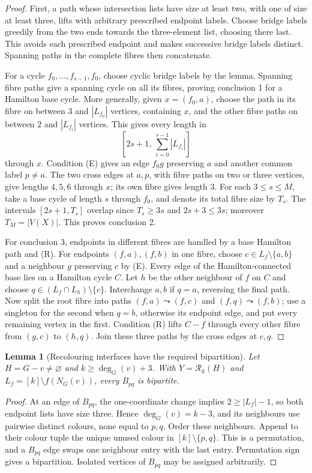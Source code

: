 \documentclass[11pt]{article}
\newtheorem{lemma}{Lemma}
\begin{document}
\begin{proof}
First, a path whose intersection lists have size at least two, with one
of size at least three, lifts with arbitrary prescribed endpoint labels. Choose
bridge labels greedily from the two ends towards the three-element list,
choosing there last. This avoids each prescribed endpoint and makes
successive bridge labels distinct. Spanning paths in the complete fibres
then concatenate.

For a cycle $f_0,\ldots,f_{s-1},f_0$, choose cyclic bridge labels by the
lemma. Spanning fibre paths give a spanning cycle on all its fibres,
proving conclusion 1 for a Hamilton base cycle. More generally, given
$x=(f_0,a)$, choose the path in its fibre on between $3$ and $|L_{f_0}|$
vertices, containing $x$, and the other fibre paths on between $2$ and
$|L_{f_i}|$ vertices. This gives every length in
\[
 [2s+1,\ \sum_{i=0}^{s-1}|L_{f_i}|]
\]
through $x$. Condition (E) gives an edge $f_0g$ preserving $a$ and
another common label $p\ne a$. The two cross edges at $a,p$, with
fibre paths on two or three vertices, give lengths $4,5,6$ through $x$;
its own fibre gives length $3$. For each $3\le s\le M$, take a base
cycle of length $s$ through $f_0$, and denote its total fibre size by
$T_s$. The intervals $[2s+1,T_s]$ overlap since $T_s\ge3s$ and
$2s+3\le3s$; moreover $T_M=|V(X)|$. This proves conclusion 2.

For conclusion 3, endpoints in different fibres are handled by a base
Hamilton path and (R). For endpoints $(f,a),(f,b)$ in one fibre, choose
$c\in L_f\setminus\{a,b\}$ and a neighbour $g$ preserving $c$ by (E).
Every edge of the Hamilton-connected base lies on a Hamilton cycle $C$.
Let $h$ be the other neighbour of $f$ on $C$ and choose
$q\in(L_f\cap L_h)\setminus\{c\}$. Interchange $a,b$ if $q=a$,
reversing the final path. Now split the root fibre into paths
$(f,a)\leadsto(f,c)$ and $(f,q)\leadsto(f,b)$; use a singleton for the
second when $q=b$, otherwise its endpoint edge, and put every remaining
vertex in the first. Condition (R) lifts $C-f$ through every other fibre
from $(g,c)$ to $(h,q)$. Join these three paths by the cross edges at
$c,q$.
\end{proof}

\begin{lemma}[Recolouring interfaces have the required bipartition]
Let $H=G-v\ne\varnothing$ and $k\ge\deg_G(v)+3$. With
$Y=\mathcal R_k(H)$ and $L_f=[k]\setminus f(N_G(v))$, every $B_{pq}$
is bipartite.
\end{lemma}
\begin{proof}
At an edge of $B_{pq}$, the one-coordinate change implies
$2\ge |L_f|-1$, so both endpoint lists have size three. Hence
$\deg_G(v)=k-3$, and its neighbours use pairwise distinct colours,
none equal to $p,q$. Order these neighbours. Append to their colour
tuple the unique unused colour in $[k]\setminus\{p,q\}$. This is a
permutation, and a $B_{pq}$ edge swaps one neighbour entry with the
last entry. Permutation sign gives a bipartition. Isolated vertices of
$B_{pq}$ may be assigned arbitrarily.
\end{proof}
\end{document}
